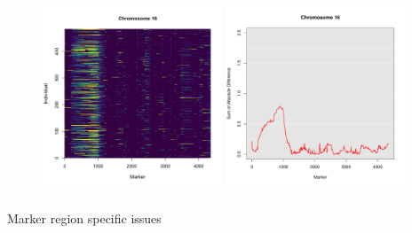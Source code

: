 \documentclass[12pt,t]{beamer}
\begin{document}
	\begin{frame}
		\begin{figure}
			\vspace{0.4in}
			{\includegraphics[height=2.3in, width=2.1in]{figures/heatmap16.png}}
			{\includegraphics[height=2.3in, width=2.1in]{figures/agg_marker_16.pdf}}
		\end{figure}
		
		\pause Marker region specific issues
	\end{frame}
	
\end{document}
